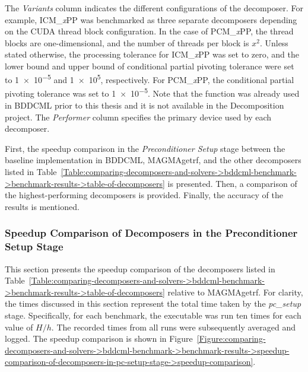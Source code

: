 \begin{table}[ht!]
{		The \textit{Variants} column indicates the different configurations of the decomposer.
		For example, ICM\_\textit{x}PP was benchmarked as three separate decomposers depending on the CUDA thread block configuration.
		In the case of PCM\_\textit{x}PP, the thread blocks are one-dimensional, and the number of threads per block is $x^2$.
		Unless stated otherwise, the processing tolerance for ICM\_\textit{x}PP was set to zero, and the lower bound and upper bound of conditional partial pivoting tolerance were set to \num{1e-5} and \num{1e+5}, respectively.
		For PCM\_\textit{x}PP, the conditional partial pivoting tolerance was set to \num{1e-5}.
		Note that the  function was already used in BDDCML prior to this thesis and it is not available in the Decomposition project.
		The \textit{Performer} column specifies the primary device used by each decomposer.
	}
	\label{Table:comparing-decomposers-and-solvers->bddcml-benchmark->benchmark-results->table-of-decomposers}
\end{table}

First, the speedup comparison in the \textit{Preconditioner Setup} stage between the baseline implementation in BDDCML, MAGMAgetrf, and the other decomposers listed in Table~\ref{Table:comparing-decomposers-and-solvers->bddcml-benchmark->benchmark-results->table-of-decomposers} is presented.
Then, a comparison of the highest-performing decomposers is provided.
Finally, the accuracy of the results is mentioned.


\subsubsection{Speedup Comparison of Decomposers in the Preconditioner Setup Stage}\label{Subsection:comparing-decomposers-and-solvers->bddcml-benchmark->benchmark-results->speedup-comparison-of-decomposers-in-pc-setup-stage}
This section presents the speedup comparison of the decomposers listed in Table~\ref{Table:comparing-decomposers-and-solvers->bddcml-benchmark->benchmark-results->table-of-decomposers} relative to MAGMAgetrf.
For clarity, the times discussed in this section represent the total time taken by the \textit{pc\_setup} stage.
Specifically, for each benchmark, the  executable was run ten times for each value of $H/h$.
The recorded times from all runs were subsequently averaged and logged.
The speedup comparison is shown in Figure~\ref{Figure:comparing-decomposers-and-solvers->bddcml-benchmark->benchmark-results->speedup-comparison-of-decomposers-in-pc-setup-stage->speedup-comparison}.

